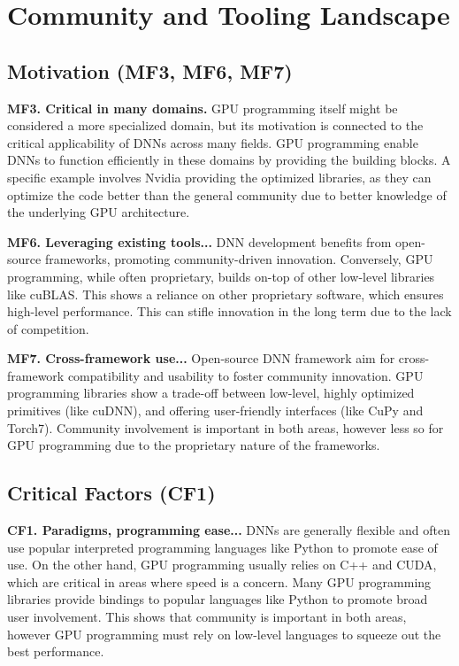 \section{Community and Tooling Landscape}
\subsection*{Motivation (MF3, MF6, MF7)}
\textbf{MF3. Critical in many domains.}
GPU programming itself might be considered a more specialized domain, but its motivation is connected to the
critical applicability of DNNs across many fields. GPU programming enable DNNs to function efficiently in
these domains by providing the building blocks. A specific example involves Nvidia providing the optimized libraries,
as they can optimize the code better than the general community due to better knowledge of the underlying GPU architecture.

\textbf{MF6. Leveraging existing tools...}
DNN development benefits from open-source frameworks, promoting community-driven innovation. Conversely, GPU programming,
while often proprietary, builds on-top of other low-level libraries like cuBLAS. This shows a reliance on other
proprietary software, which ensures high-level performance. This can stifle innovation in the long term due
to the lack of competition.

\textbf{MF7. Cross-framework use...}
Open-source DNN framework aim for cross-framework compatibility and usability to foster community innovation.
GPU programming libraries show a trade-off between low-level, highly optimized primitives (like cuDNN), and offering
user-friendly interfaces (like CuPy and Torch7). Community involvement is important in both areas, however
less so for GPU programming due to the proprietary nature of the frameworks.

\subsection*{Critical Factors (CF1)}
\textbf{CF1. Paradigms, programming ease...}
DNNs are generally flexible and often use popular interpreted programming languages like Python to
promote ease of use. On the other hand, GPU programming usually relies on C++ and CUDA, which are
critical in areas where speed is a concern. Many GPU programming libraries provide bindings to
popular languages like Python to promote broad user involvement. This shows that community is
important in both areas, however GPU programming must rely on low-level languages to squeeze out
the best performance.

